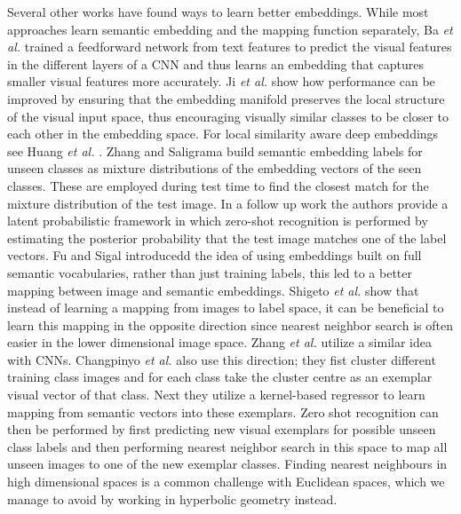\documentclass[12pt]{report}
\begin{document}
Several other works have found ways to learn better embeddings. While most approaches learn semantic embedding and the mapping function separately, Ba \textit{et al.} \cite{Ba2015} trained a feedforward network from text features to predict the visual features in the different layers of a CNN and thus learns an embedding that captures smaller visual features more accurately. Ji \textit{et al.} \cite{Ji2017} show how performance can be improved by ensuring that the embedding manifold preserves the local structure of the visual input space, thus encouraging visually similar classes to be closer to each other in the embedding space. For local similarity aware deep embeddings see Huang \textit{et al.} \cite{Huang2016}. Zhang and Saligrama \cite{Zhang2015} build semantic embedding labels for unseen classes as mixture distributions of the embedding vectors of the seen classes. These are employed during test time to find the closest match for the mixture distribution of the test image. In a follow up work the authors \cite{Zhang2015a} provide a latent probabilistic framework in which zero-shot recognition is performed by estimating the posterior probability that the test image matches one of the label vectors. Fu and Sigal \cite{Fu2016} introducedd the idea of using embeddings built on full semantic vocabularies, rather than just training labels, this led to a better mapping between image and semantic embeddings. Shigeto \textit{et al.} \cite{Shigeto2015} show that instead of learning a mapping from images to label space, it can be beneficial to learn this mapping in the opposite direction since nearest neighbor search is often easier in the lower dimensional image space. Zhang \textit{et al.} utilize a similar idea with CNNs. Changpinyo \textit{et al.} \cite{Changpinyo2017} also use this direction; they fist cluster different training class images and for each class take the cluster centre as an exemplar visual vector of that class. Next they utilize a kernel-based regressor to learn mapping from semantic vectors into these exemplars. Zero shot recognition can then be performed by first predicting new visual exemplars for possible unseen class labels and then performing nearest neighbor search in this space to map all unseen images to one of the new exemplar classes. Finding nearest neighbours in high dimensional spaces is a common challenge with Euclidean spaces, which we manage to avoid by working in hyperbolic geometry instead.
\end{document}
